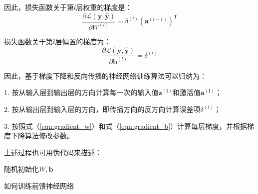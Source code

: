 因此，损失函数关于第$l$层权重的梯度是：
\begin{equation}
\label{eqn:gradient_w} 
\frac{\partial \mathcal{L}(\mathbf{y}, \hat{\mathbf{y}})}{\partial W^{(l)}}=\delta^{(l)}\left(\mathbf{a}^{(l-1)}\right)^{\mathrm{T}}
\end{equation}

损失函数关于第$l$层偏置的梯度为：
\begin{equation} 
\label{eqn:gradient_b}
\frac{\partial \mathcal{L}(\mathbf{y}, \hat{\mathbf{y}})}{\partial \mathbf{b}^{(l)}}=\delta^{(l)}
\end{equation}

因此，基于梯度下降和反向传播的神经网络训练算法可以归纳为：

1. 按从输入层到输出层的方向计算每一次的输入值$\mathbf{z^{(l)}}$和激活值$\mathbf{a^{(l)}}$； 

2. 按从输出层到输入层的方向，即传播方向的反方向计算误差项$\delta^{(l)}$； 

3. 按照式（\ref{eqn:gradient_w}）和式（\ref{eqn:gradient_b}）计算每层梯度，并根据梯度下降算法修改参数。

上述过程也可用伪代码来描述：
\begin{algorithm}[H]
	随机初始化$W, \mathbf{b}$
	\caption{如何训练前馈神经网络}
   \end{algorithm}

